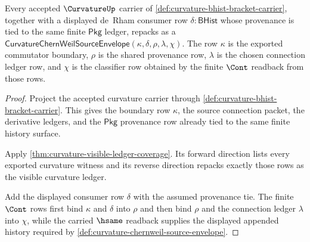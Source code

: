 \begin{theorem}
\label{thm:curvature-chernweil-source-envelope-coverage}
Every accepted $\CurvatureUp$ carrier of \autoref{def:curvature-bhist-bracket-carrier}, together with a displayed de~Rham consumer row $\delta:\mathsf{BHist}$ whose provenance is tied to the same finite $\mathsf{Pkg}$ ledger, repacks as a $\mathsf{CurvatureChernWeilSourceEnvelope}(\kappa,\delta,\rho,\lambda,\chi)$. The row $\kappa$ is the exported commutator boundary, $\rho$ is the shared provenance row, $\lambda$ is the chosen connection ledger row, and $\chi$ is the classifier row obtained by the finite $\Cont$ readback from those rows.
\end{theorem}
\begin{proof}
Project the accepted curvature carrier through \autoref{def:curvature-bhist-bracket-carrier}. This gives the boundary row $\kappa$, the source connection packet, the derivative ledgers, and the $\mathsf{Pkg}$ provenance row already tied to the same finite history surface.

Apply \autoref{thm:curvature-visible-ledger-coverage}. Its forward direction lists every exported curvature witness and its reverse direction repacks exactly those rows as the visible curvature ledger.

Add the displayed consumer row $\delta$ with the assumed provenance tie. The finite $\Cont$ rows first bind $\kappa$ and $\delta$ into $\rho$ and then bind $\rho$ and the connection ledger $\lambda$ into $\chi$, while the carried $\hsame$ readback supplies the displayed appended history required by \autoref{def:curvature-chernweil-source-envelope}.
\end{proof}

